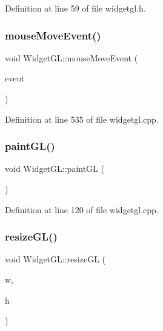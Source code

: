 Definition at line 59 of file widgetgl.\+h.

\mbox{\label{class_widget_g_l_a9de485d82190e15b30ab133f0e4613cc}} 
\subsubsection{\texorpdfstring{mouseMoveEvent()}{mouseMoveEvent()}}
{\footnotesize\ttfamily void Widget\+G\+L\+::mouse\+Move\+Event (\begin{DoxyParamCaption}\item[{Q\+Mouse\+Event $\ast$}]{event }\end{DoxyParamCaption})\hspace{0.3cm}{\ttfamily [protected]}}



Definition at line 535 of file widgetgl.\+cpp.

\mbox{\label{class_widget_g_l_a9a712ef58aae13b079aa6db8bbf5736b}} 
\subsubsection{\texorpdfstring{paintGL()}{paintGL()}}
{\footnotesize\ttfamily void Widget\+G\+L\+::paint\+GL (\begin{DoxyParamCaption}{ }\end{DoxyParamCaption})\hspace{0.3cm}{\ttfamily [protected]}}



Definition at line 120 of file widgetgl.\+cpp.

\mbox{\label{class_widget_g_l_ac8aeef8e692fe6c65e287370bc08b0f4}} 
\subsubsection{\texorpdfstring{resizeGL()}{resizeGL()}}
{\footnotesize\ttfamily void Widget\+G\+L\+::resize\+GL (\begin{DoxyParamCaption}\item[{int}]{w,  }\item[{int}]{h }\end{DoxyParamCaption})\hspace{0.3cm}{\ttfamily [protected]}}



